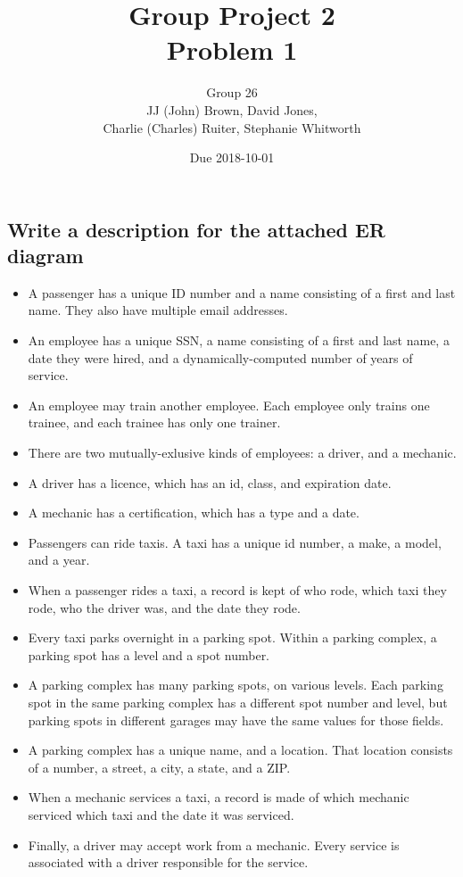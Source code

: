 \documentclass{article}
\title{Group Project 2\\Problem 1}
\author{Group 26\\JJ (John) Brown, David Jones,\\Charlie (Charles) Ruiter, Stephanie Whitworth}
\date{Due 2018-10-01}
\begin{document}
\maketitle

\section{}
\subsection{Write a description for the attached ER diagram}

\begin{itemize}
\item A passenger has a unique ID number and a name consisting of a first and last name. They also have multiple email addresses.
\item An employee has a unique SSN, a name consisting of a first and last name, a date they were hired, and a dynamically-computed number of years of service.
\item An employee may train another employee. Each employee only trains one trainee, and each trainee has only one trainer.
\item There are two mutually-exlusive kinds of employees: a driver, and a mechanic.
\item A driver has a licence, which has an id, class, and expiration date.
\item A mechanic has a certification, which has a type and a date.
\item Passengers can ride taxis. A taxi has a unique id number, a make, a model, and a year.
\item When a passenger rides a taxi, a record is kept of who rode, which taxi they rode, who the driver was, and the date they rode.
\item Every taxi parks overnight in a parking spot. Within a parking complex, a parking spot has a level and a spot number.
\item A parking complex has many parking spots, on various levels. Each parking spot in the same parking complex has a different spot number and level, but parking spots in different garages may have the same values for those fields.
\item A parking complex has a unique name, and a location. That location consists of a number, a street, a city, a state, and a ZIP.
\item When a mechanic services a taxi, a record is made of which mechanic serviced which taxi and the date it was serviced.
\item Finally, a driver may accept work from a mechanic. Every service is associated with a driver responsible for the service.
\end{itemize}
\end{document}
